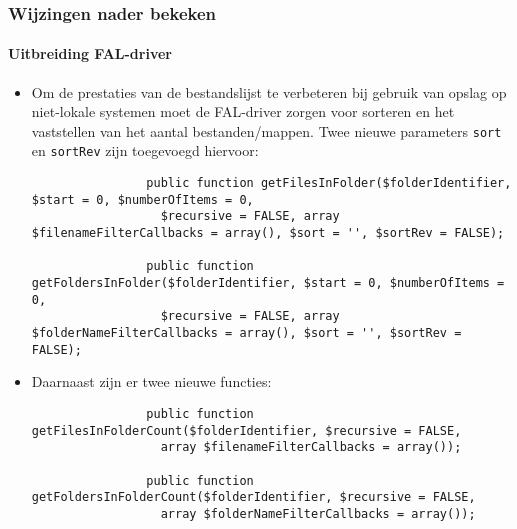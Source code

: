 \begin{frame}[fragile]
	\frametitle{Wijzingen nader bekeken}
	\framesubtitle{Uitbreiding FAL-driver}

	\lstset{basicstyle=\tiny\ttfamily}

	\begin{itemize}
		\item Om de prestaties van de bestandslijst te verbeteren bij gebruik van opslag op
			niet-lokale systemen moet de FAL-driver zorgen voor sorteren en het vaststellen van
			het aantal bestanden/mappen. Twee nieuwe parameters \texttt{sort} en \texttt{sortRev} zijn
			toegevoegd hiervoor:

			\begin{lstlisting}
				public function getFilesInFolder($folderIdentifier, $start = 0, $numberOfItems = 0,
				  $recursive = FALSE, array $filenameFilterCallbacks = array(), $sort = '', $sortRev = FALSE);

				public function getFoldersInFolder($folderIdentifier, $start = 0, $numberOfItems = 0,
				  $recursive = FALSE, array $folderNameFilterCallbacks = array(), $sort = '', $sortRev = FALSE);
			\end{lstlisting}

		\item Daarnaast zijn er twee nieuwe functies:

			\begin{lstlisting}
				public function getFilesInFolderCount($folderIdentifier, $recursive = FALSE,
				  array $filenameFilterCallbacks = array());

				public function getFoldersInFolderCount($folderIdentifier, $recursive = FALSE,
				  array $folderNameFilterCallbacks = array());
			\end{lstlisting}

	\end{itemize}

\end{frame}

